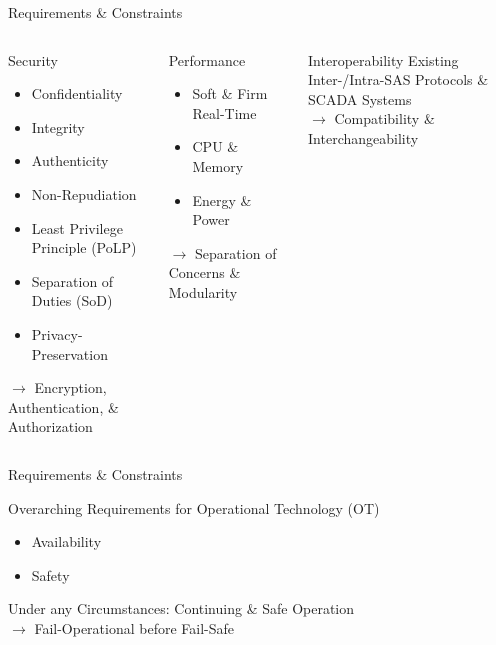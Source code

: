 \documentclass[en]{sdqbeamer}
\begin{document}
\begin{frame}{Requirements \& Constraints}
    \begin{columns}
        \begin{blueblock}{Security}
            \begin{itemize}
                \item Confidentiality
                \item Integrity
                \item Authenticity
                \item Non-Repudiation
                \item Least Privilege Principle (PoLP)
                \item Separation of Duties (SoD)
                \item Privacy-Preservation
            \end{itemize}
            $\rightarrow$ Encryption, Authentication, \& Authorization
        \end{blueblock}
        \begin{blueblock}{Performance}
            \begin{itemize}
                \item Soft \& Firm Real-Time
                \item CPU \& Memory
                \item Energy \& Power
            \end{itemize}
            $\rightarrow$ Separation of Concerns \& Modularity
        \end{blueblock}
        \begin{blueblock}{Interoperability}
             Existing Inter-/Intra-SAS Protocols \& SCADA Systems
             \\$\rightarrow$ Compatibility \& Interchangeability
        \end{blueblock}
    \end{columns}
\end{frame}
\begin{frame}{Requirements \& Constraints}
    \begin{redblock}{Overarching Requirements for Operational Technology (OT)}
        \begin{itemize}
            \item Availability
            \item Safety
        \end{itemize}
        Under any Circumstances: Continuing \& Safe Operation
        \\$\rightarrow$ Fail-Operational before Fail-Safe
    \end{redblock}
\end{frame}
\end{document}
